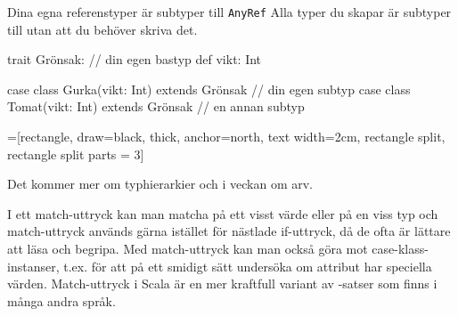 \begin{Slide}{Dina egna referenstyper är subtyper till \texttt{AnyRef}}\SlideFontSmall
Alla typer du skapar är subtyper till  utan att du behöver skriva det.
\begin{Code}
trait Grönsak:                                 // din egen bastyp
  def vikt: Int

case class Gurka(vikt: Int) extends Grönsak    // din egen subtyp
case class Tomat(vikt: Int) extends Grönsak    // en annan subtyp
\end{Code}
\SlideFontSmall\ifkompendium\footnotesize\fi
\vspace{-0.0em}\begin{center}
\newcommand{\TextBox}[1]{\raisebox{0pt}[1em][0.5em]{#1}}
=[rectangle, draw=black,  thick, anchor=north, text width=2cm, rectangle split, rectangle split parts = 3]
\end{center}
Det kommer mer om typhierarkier och  i veckan om arv.
\end{Slide}


\ifkompendium
\noindent  I ett match-uttryck kan man matcha på ett visst värde eller på en viss typ och match-uttryck används gärna istället för nästlade if-uttryck, då de ofta är lättare att läsa och begripa. Med match-uttryck kan man också göra  mot case-klass-instanser, t.ex. för att på ett smidigt sätt undersöka om attribut har speciella värden. Match-uttryck i Scala är en mer kraftfull variant av -satser som finns i många andra språk.  
\fi

